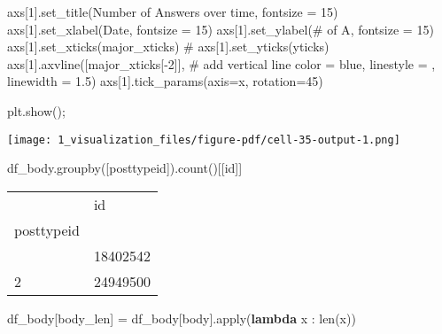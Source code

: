 \documentclass[
  letterpaper,
  DIV=11,
  numbers=noendperiod]{scrartcl}
\newenvironment{Shaded}{\begin{snugshade}}{\end{snugshade}}
\newcommand{\BuiltInTok}[1]{\textcolor[rgb]{0.00,0.23,0.31}{#1}}
\newcommand{\CommentTok}[1]{\textcolor[rgb]{0.37,0.37,0.37}{#1}}
\newcommand{\DecValTok}[1]{\textcolor[rgb]{0.68,0.00,0.00}{#1}}
\newcommand{\FloatTok}[1]{\textcolor[rgb]{0.68,0.00,0.00}{#1}}
\newcommand{\KeywordTok}[1]{\textcolor[rgb]{0.00,0.23,0.31}{\textbf{#1}}}
\newcommand{\NormalTok}[1]{\textcolor[rgb]{0.00,0.23,0.31}{#1}}
\newcommand{\OperatorTok}[1]{\textcolor[rgb]{0.37,0.37,0.37}{#1}}
\newcommand{\StringTok}[1]{\textcolor[rgb]{0.13,0.47,0.30}{#1}}
\begin{document}
\begin{Shaded}
\begin{Highlighting}[]
\NormalTok{axs[}\DecValTok{1}\NormalTok{].set\_title(}\StringTok{\textquotesingle{}Number of Answers over time\textquotesingle{}}\NormalTok{, fontsize }\OperatorTok{=} \DecValTok{15}\NormalTok{)}
\NormalTok{axs[}\DecValTok{1}\NormalTok{].set\_xlabel(}\StringTok{\textquotesingle{}Date\textquotesingle{}}\NormalTok{, fontsize }\OperatorTok{=} \DecValTok{15}\NormalTok{)}
\NormalTok{axs[}\DecValTok{1}\NormalTok{].set\_ylabel(}\StringTok{\textquotesingle{}\# of A\textquotesingle{}}\NormalTok{, fontsize }\OperatorTok{=} \DecValTok{15}\NormalTok{)}
\NormalTok{axs[}\DecValTok{1}\NormalTok{].set\_xticks(major\_xticks)}
\CommentTok{\# axs[1].set\_yticks(yticks)}
\NormalTok{axs[}\DecValTok{1}\NormalTok{].axvline([major\_xticks[}\OperatorTok{{-}}\DecValTok{2}\NormalTok{]], }\CommentTok{\# add vertical line}
\NormalTok{           color }\OperatorTok{=} \StringTok{\textquotesingle{}blue\textquotesingle{}}\NormalTok{,}
\NormalTok{           linestyle }\OperatorTok{=} \StringTok{\textquotesingle{}{-}{-}\textquotesingle{}}\NormalTok{,}
\NormalTok{           linewidth }\OperatorTok{=} \FloatTok{1.5}\NormalTok{)}
\NormalTok{axs[}\DecValTok{1}\NormalTok{].tick\_params(axis}\OperatorTok{=}\StringTok{\textquotesingle{}x\textquotesingle{}}\NormalTok{, rotation}\OperatorTok{=}\DecValTok{45}\NormalTok{)}

\NormalTok{plt.show()}\OperatorTok{;}
\end{Highlighting}
\end{Shaded}

\texttt{[image: 1\_visualization\_files/figure-pdf/cell-35-output-1.png]}

\begin{Shaded}
\begin{Highlighting}[]
\NormalTok{df\_body.groupby([}\StringTok{\textquotesingle{}posttypeid\textquotesingle{}}\NormalTok{]).count()[[}\StringTok{\textquotesingle{}id\textquotesingle{}}\NormalTok{]]}
\end{Highlighting}
\end{Shaded}

\begin{longtable}[]{@{}ll@{}}
\toprule\noalign{}
& id \\
posttypeid & \\
\midrule\noalign{}
\endhead
\bottomrule\noalign{}
\endlastfoot
1 & 18402542 \\
2 & 24949500 \\
\end{longtable}

\begin{Shaded}
\begin{Highlighting}[]
\NormalTok{df\_body[}\StringTok{\textquotesingle{}body\_len\textquotesingle{}}\NormalTok{] }\OperatorTok{=}\NormalTok{ df\_body[}\StringTok{\textquotesingle{}body\textquotesingle{}}\NormalTok{].}\BuiltInTok{apply}\NormalTok{(}\KeywordTok{lambda}\NormalTok{ x : }\BuiltInTok{len}\NormalTok{(x))}
\end{Highlighting}
\end{Shaded}
\end{document}
